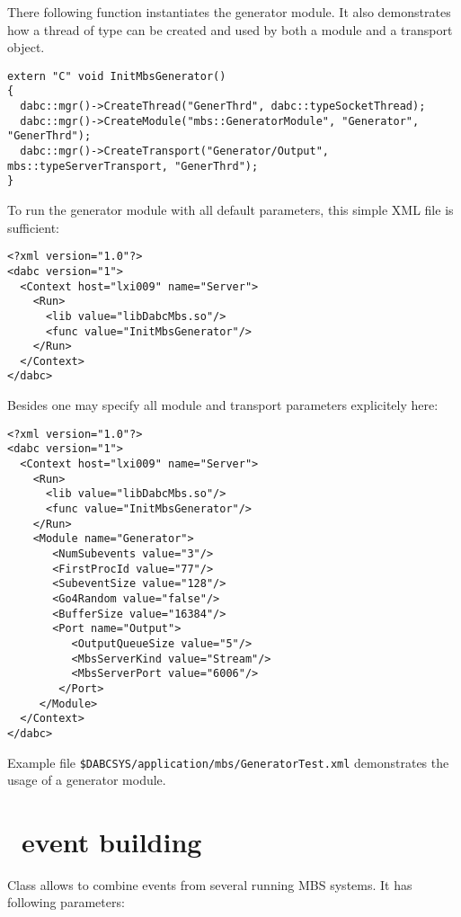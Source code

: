 There following function  instantiates the generator module.
It also demonstrates how a thread of type  can be created
and used by both a module and a transport object. 
\begin{small}
\begin{verbatim}
extern "C" void InitMbsGenerator()
{
  dabc::mgr()->CreateThread("GenerThrd", dabc::typeSocketThread);
  dabc::mgr()->CreateModule("mbs::GeneratorModule", "Generator", "GenerThrd");
  dabc::mgr()->CreateTransport("Generator/Output", mbs::typeServerTransport, "GenerThrd");
}
\end{verbatim}
\end{small}

To run the generator module with all default parameters, 
this simple XML file is sufficient:   
\begin{small}
\begin{verbatim}
<?xml version="1.0"?>
<dabc version="1">
  <Context host="lxi009" name="Server">
    <Run>
      <lib value="libDabcMbs.so"/>
      <func value="InitMbsGenerator"/>
    </Run>
  </Context>
</dabc>
\end{verbatim}
\end{small}

Besides one may specify all module and transport parameters explicitely here:
\begin{small}
\begin{verbatim}
<?xml version="1.0"?>
<dabc version="1">
  <Context host="lxi009" name="Server">
    <Run>
      <lib value="libDabcMbs.so"/>
      <func value="InitMbsGenerator"/>
    </Run>
    <Module name="Generator">
       <NumSubevents value="3"/>
       <FirstProcId value="77"/>
       <SubeventSize value="128"/>
       <Go4Random value="false"/>
       <BufferSize value="16384"/>
       <Port name="Output">
          <OutputQueueSize value="5"/>
          <MbsServerKind value="Stream"/>
          <MbsServerPort value="6006"/>
        </Port>
     </Module>
  </Context>
</dabc>
\end{verbatim}
\end{small}

Example file {\tt \$DABCSYS/application/mbs/GeneratorTest.xml}  
demonstrates the usage of a generator module. 


\section[MBS event building]{\mbs\ event building}
Class  allows to combine events from
several running MBS systems. It has following parameters:

